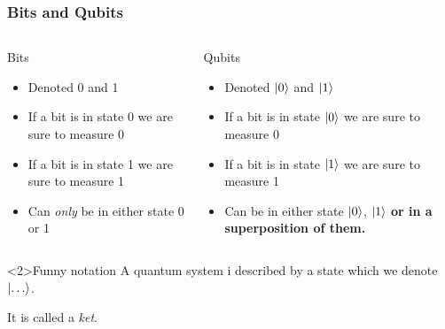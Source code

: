 \documentclass[10pt]{beamer}
\begin{document}
\begin{frame}
  \frametitle{Bits and Qubits}
  \begin{columns}
    \begin{column}{0.5\linewidth}
      \begin{block}{Bits}
        \begin{itemize}
        \item Denoted 0 and 1
        \item If a bit is in state 0 we are sure to measure 0
        \item If a bit is in state 1 we are sure to measure 1
        \item Can \emph{only} be in either state 0 or 1
        \end{itemize}
      \end{block}
    \end{column}
    \begin{column}{0.5\linewidth}
      \begin{block}{Qubits}
        \begin{itemize}
        \item Denoted $\ket{0}$ and $\ket{1}$
        \item If a bit is in state $\ket{0}$ we are sure to measure 0
        \item If a bit is in state $\ket{1}$ we are sure to measure 1
        \item Can be in either state $\ket{0}$, $\ket{1}$ \textbf{or in a superposition of them.}
        \end{itemize}
      \end{block}
    \end{column}
  \end{columns}
  
  \begin{block}<2>{Funny notation}
    A quantum system i described by a state which we denote $\ket{\dots}$.

    It is called a \emph{ket}.
  \end{block}
\end{frame}
\end{document}
